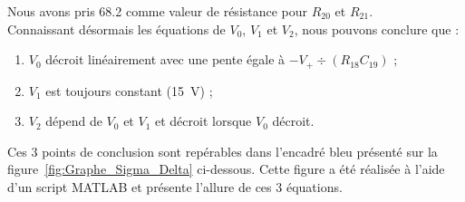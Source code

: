 \documentclass[10pt, oneside, a4paper]{article}
\begin{document}
Nous avons pris \SI{68.2}{\Omega} comme valeur de résistance pour $R_{20}$ et $R_{21}$. \\
Connaissant désormais les équations de $V_0$, $V_1$ et $V_2$, nous pouvons conclure que : 
\begin{enumerate}
    \item $V_0$ décroit linéairement avec une pente égale à $-V_+ \div
        \left(R_{18} C_{19}\right)$ ;
    \item $V_1$ est toujours constant (\SI{15}{\volt}) ;
    \item $V_2$ dépend de $V_0$ et $V_1$ et décroit lorsque $V_0$ décroit.
\end{enumerate}
Ces 3 points de conclusion sont repérables dans l'encadré bleu présenté sur la figure~\ref{fig:Graphe_Sigma_Delta} ci-dessous.
Cette figure a été réalisée à l'aide d'un script MATLAB et présente l'allure de ces 3 équations.
\end{document}
